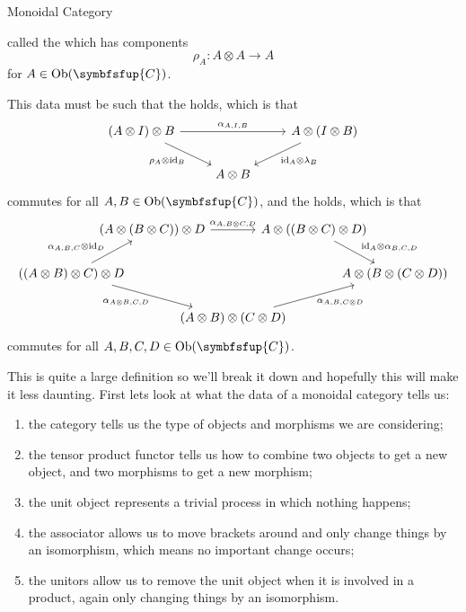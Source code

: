\documentclass[fleqn]{NotesClass}
\newcommand{\cat}[1]{\symbfsfup{#1}}
\DeclareMathOperator{\Ob}{Ob}
\DeclareMathOperator{\id}{id}
\begin{document}
\begin{dfn}{Monoidal Category}{}
\begin{enumerate}
\begin{equation}
            \end{equation}
            called the  which has components
            \begin{equation}
                \rho_A \colon A \otimes A \to A
            \end{equation}
            for \(A \in \Ob(\cat{C})\).
        \end{enumerate}
        This data must be such that the  holds, which is that 
        \begin{equation}
            \begin{tikzcd}
                (A \otimes I) \otimes B \arrow[rr, "\alpha_{A, I, B}"] \arrow[dr, "\rho_A \otimes \id_B"'] && A \otimes (I \otimes B) \arrow[dl, "{\id_A} \otimes \lambda_B"]\\
                & A \otimes B &
            \end{tikzcd}
        \end{equation}
        commutes for all \(A, B \in \Ob(\cat{C})\), and the  holds, which is that
        \begin{equation}
            \begin{tikzcd}[column sep=-1cm]
                & (A \otimes (B \otimes C)) \otimes D \arrow[rr, "\alpha_{A, B \otimes C, D}"] && A \otimes ((B \otimes C) \otimes D) \arrow[dr, "{\id_A} \otimes \alpha_{B,C,D}", pos=0.6] & \\
                ((A \otimes B) \otimes C) \otimes D \arrow[ur, "\alpha_{A,B,C} \otimes \id_D", pos=0.4] \arrow[drr, "\alpha_{A\otimes B,C,D}"'] &&&& A \otimes (B \otimes (C \otimes D)) \\
                && (A \otimes B) \otimes (C \otimes D) \arrow[urr, "\alpha_{A,B,C\otimes D}"'] && 
            \end{tikzcd}
        \end{equation}
        commutes for all \(A, B, C, D \in \Ob(\cat{C})\).
    \end{dfn}
    
    This is quite a large definition so we'll break it down and hopefully this will make it less daunting.
    First lets look at what the data of a monoidal category tells us:
    \begin{enumerate}
        \item the category tells us the type of objects and morphisms we are considering;
        \item the tensor product functor tells us how to combine two objects to get a new object, and two morphisms to get a new morphism;
        \item the unit object represents a trivial process in which nothing happens;
        \item the associator allows us to move brackets around and only change things by an isomorphism, which means no important change occurs;
        \item the unitors allow us to remove the unit object when it is involved in a product, again only changing things by an isomorphism.
    \end{enumerate}
    
\end{document}

